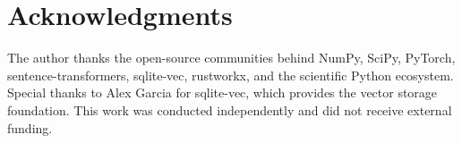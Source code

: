 \section*{Acknowledgments}

The author thanks the open-source communities behind NumPy, SciPy, PyTorch, sentence-transformers, sqlite-vec, rustworkx, and the scientific Python ecosystem. Special thanks to Alex Garcia for sqlite-vec, which provides the vector storage foundation. This work was conducted independently and did not receive external funding.

